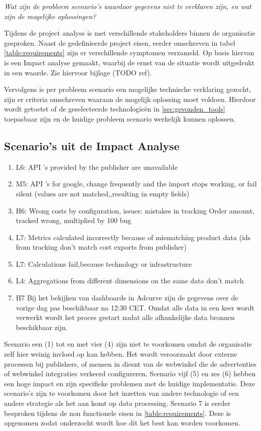 \textit{Wat zijn de probleem scenario's waardoor gegevens niet te verklaren zijn, en wat zijn de mogelijke oplossingen?}

Tijdens de project analyse is met verschillende stakeholders binnen de organisatie gesproken. Naast de gedefinieerde project eisen, eerder omschreven in tabel \ref{table:requirements} zijn er verschillende symptomen verzameld. Op basis hiervan is een Impact analyse gemaakt, waarbij de ernst van de situatie wordt uitgedrukt in een waarde. Zie hiervoor bijlage (TODO ref).

Vervolgens is per probleem scenario een mogelijke technische verklaring gezocht, zijn er criteria omschreven waaraan de mogelijk oplossing moet voldoen. Hierdoor wordt getoetst of de geselecteerde technologieën in  \ref{sec:gevonden_tools} toepasbaar zijn en de huidige probleem scenario werkelijk kunnen oplossen.

\subsection{Scenario's uit de Impact Analyse}


\begin{enumerate}
    \item L6: API 's provided by the publisher are unavailable
    \item M5: API 's for google, change frequently and the import stops working, or fail silent (values are not matched,,resulting in empty fields)
    \item H6: Wrong costs by configuration, issues: mistakes in tracking Order amount, tracked wrong, multiplied by 100 bug
    \item L7: Metrics calculated incorrectly because of mismatching product data (ids from tracking don't match cost exports from publisher)
    \item L7: Calculations fail,because technology or infrastructure 
    \item L4: Aggregations from different dimensions on the same data
    don't match
    \item H7 Bij het bekijken van dashboards in Adcurve zijn de gegevens over de vorige dag pas beschikbaar na 12:30 CET. Omdat alle data in een keer wordt verwerkt wordt het proces gestart nadat alle afhankelijke data bronnen beschikbaar zijn.
\end{enumerate}

Scenario een (1) tot en met vier (4) zijn niet te voorkomen omdat de organisatie zelf hier weinig invloed op kan hebben. Het wordt veroorzaakt door externe processen bij publishers, of mensen in diesnt van de webwinkel die de advertenties of webwinkel integraties verkeerd configureren. Scenario vijf (5) en zes (6) hebben een hoge impact en zijn specifieke problemen met de huidige implementatie. Deze scenario's zijn te voorkomen door het inzetten van andere technologie of een andere strategie als het aan komt op data processing.
Scenario 7 is eerder besproken tijdens de non functionele eisen in \ref{table:requirements}. Deze is opgenomen zodat onderzocht wordt hoe dit het best kan worden voorkomen.  

